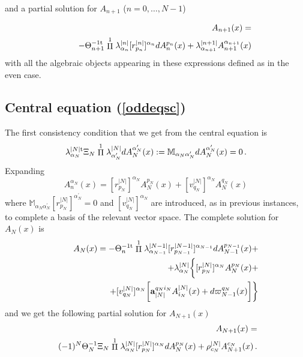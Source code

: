 \documentclass[prd,a4paper,twocolumn,amssymb,amsmath,nofootinbib,showpacs]{revtex4}
\begin{document}
\noindent and a partial solution for $A_{n+1}$ ($n=0,\ldots,N-1$)

\begin{eqnarray}
&&\hspace{-.8cm}A_{n+1}(x)=\label{solparoddAn+1}\\
&&\hspace{.4cm}-\Theta_{n+1}^{-1\rm{t}}\stackrel{1}{\Pi}
\lambda_{\alpha_n}^{|n|} [r^{|n|}_{p_n}]^{\alpha_n} dA_n^{p_n}(x)+
\lambda_{\alpha_{n+1}}^{|n+1|}A_{n+1}^{\alpha_{n+1}}(x)\nonumber
\end{eqnarray}
with all the algebraic objects appearing in these expressions
defined as in the even case.

\subsection{\label{Eqoddc} Central equation (\ref{oddeqsc})}

The first consistency condition that we get from the central
equation is
\begin{equation}
\lambda^{|N|{\rm{t}}}_{\alpha_N}\Xi_N\stackrel{1}{\Pi}\lambda^{|N|}_{\alpha_N^{\prime}}
dA_N^{\alpha_N^{\prime}}(x):=\mathbb{M}_{\alpha_N\alpha_N^{\prime}}
dA_N^{\alpha_N^{\prime}}(x)=0\,.\label{matrixmm}
\end{equation}
Expanding
$$
A_n^{\alpha_N}(x)=[r^{|N|}_{p_N}]^{\alpha_N}A_N^{p_N}(x)+
[v^{|N|}_{q_N}]^{\alpha_N}A_N^{q_N}(x)
$$
where
$\mathbb{M}_{\alpha_N\alpha_N^{\prime}}[r^{|N|}_{p_N}]^{\alpha_N^{\prime}}=0$
and $[v^{|N|}_{q_N}]^{\alpha_N}$ are introduced, as in previous
instances, to complete a basis of the relevant vector space. The
complete solution for $A_N(x)$ is
\begin{eqnarray}
&&\hspace{-.5cm}A_N(x)=-\Theta_n^{-1\rm{t}}\stackrel{1}{\Pi}
\lambda_{\alpha_{N-1}}^{|N-1|}[r^{|N-1|}_{p_{N-1}}]^{\alpha_{N-1}}
dA_{N-1}^{p_{N-1}}(x)+\nonumber\\
&&\hspace{-.5cm}+\lambda_{\alpha_N}^{|N|}
\bigg\{[r^{|N|}_{p_N}]^{\alpha_N}A^{p_N}_N(x)+
\label{CompSoloddAN}\\
&&\hspace{2cm}+[v^{|N|}_{q_N}]^{\alpha_N}
\bigg[\mathbf{a}_{|N|}^{q_Ni_N}A^{|N|}_{i_N}(x)+
d\varpi_{N-1}^{q_N}(x)\bigg]\bigg\}\nonumber
\end{eqnarray}
and we get the following partial solution for $A_{N+1}(x)$
\begin{eqnarray}
&&\hspace{-.5cm}A_{N+1}(x)=\label{solparoddAN+1}\\
&&\hspace{-.2cm}(-1)^N\Theta_{N}^{-1}\Xi_N\stackrel{1}{\Pi}
\lambda_{\alpha_N}^{|N|} [r^{|N|}_{p_N}]^{\alpha_N} dA_N^{p_N}(x)+
\rho_{c_N}^{|N|}A_{N+1}^{c_N}(x)\,.\nonumber
\end{eqnarray}
\end{document}
